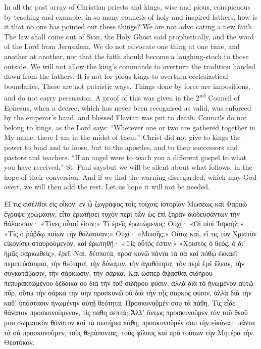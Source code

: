 \documentclass[10pt]{book}
\newcommand{\switchGreek}[1][]{\selectlanguage{polutonikogreek} \switchcolumn*[#1]}
\begin{document}
\begin{paracol}{2}
In all the past array of Christian priests and 
kings, wise and pious, conspicuous by teaching 
and example, in so many councils of holy and 
inspired fathers, how is it that no one has 
pointed out these things? We are not advo 
cating a new faith. The law shall come out of 
Sion, the Holy Ghost said prophetically, and 
the word of the Lord from Jerusalem. We do 
not advocate one thing at one time, and another 
at another, nor that the faith should become a 
laughing-stock to those outside. We will not 
allow the king's commands to overturn the 
tradition handed down from the fathers. It is 
not for pious kings to overturn ecclesiastical 
boundaries. These are not patristic ways. 
Things done by force are impositions, and do 
not carry persuasion. A proof of this was given 
in the 2\textsuperscript{nd} Council of Ephesus, when a decree, 
which has never been recognised as valid, was 
enforced by the emperor's hand, and blessed 
Flavian was put to death. Councils do not 
belong to kings, as the Lord says: ``Wherever 
one or two are gathered together in My name, 
there I am in the midst of them.'' Christ did 
not give to kings the power to bind and to 
loose, but to the apostles, and to their successors
and pastors and teachers. ``If an angel 
were to teach you a different gospel to what 
you have received,'' St. Paul says\textemdash but we will 
be silent about what follows, in the hope of 
their conversion. And if we find the warning 
disregarded, which may God avert, we will 
then add the rest. Let us hope it will not be 
needed. 

\switchGreek

Εἴ τις εἰσέλθοι εἰς οἶκον, ἐν ᾧ ζωγράφος τοῖς τοίχοις ἱστορίαν Μωσέως καὶ
Φαραὼ ἔγραψε χρώμασιν, εἶτα ἐρωτήσει τυχὸν περὶ τῶν ὡς ἐπὶ ξηρὰν διοδευσάντων
τὴν θάλασσαν· «Τίνες οὗτοί εἰσιν;» Τί ἐρεῖς ἐρωτώμενος; Οὐχί· «Οἱ υἱοὶ
Ἰσραήλ;» «Τίς ὁ ῥάβδῳ παίων τὴν θάλασσαν;» Οὐχί· «Μωσῆς;» Οὕτω καί, εἴ τις τὸν
Χριστὸν εἰκονίσει σταυρούμενον, καὶ ἐρωτηθῇ· «Τίς οὗτός ἐστιν;» «Χριστὸς ὁ
θεός, ὁ δι’ ἡμᾶς σαρκωθείς», ἐρεῖ. Ναί, δέσποτα, προσ κυνῶ πάντα τὰ σὰ καὶ
πόθῳ ἐκκαεῖ περιπτύσσομαι, τὴν θεότητα, τὴν δύναμιν, τὴν ἀγαθότητα, τὸν περὶ
ἐμὲ ἔλεον, τὴν συγκατάβασιν, τὴν σάρκωσιν, τὴν σάρκα. Καὶ ὥσπερ ἅψασθαι
σιδήρου πεπυρακτωμένου δέδοικα οὐ διὰ τὴν τοῦ σιδήρου φύσιν, ἀλλὰ διὰ τὸ
ἡνωμένον αὐτῷ πῦρ, οὕτω τὴν σάρκα τὴν σὴν προσκυνῶ οὐ διὰ τὴν τῆς σαρκὸς
φύσιν, ἀλλὰ διὰ τὴν καθ’ ὑπόστασιν ἡνωμένην αὐτῇ θεότητα. Προσκυνοῦμέν σου τὰ
πάθη. Τίς εἶδε θάνατον προσκυνούμενον, τίς πάθη σεπτά; Ἀλλ’ ὄντως προσκυνοῦμεν
τὸν τοῦ θεοῦ μου σωματικὸν θάνατον καὶ τὰ σωτήρια πάθη, προσκυνοῦμέν σου τὴν
εἰκόνα· πάντα τὰ σὰ προσκυνοῦμεν, τοὺς θεράποντας, τοὺς φίλους καὶ πρὸ τούτων
τὴν Μητέρα τὴν Θεοτόκον. 


\end{paracol}
\end{document}

